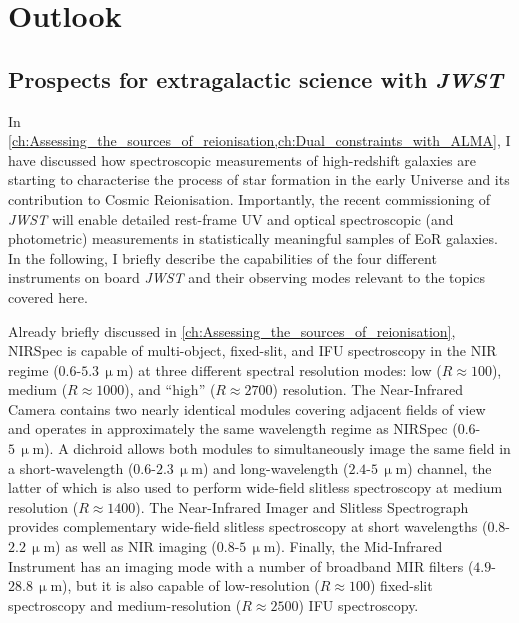 \section{Outlook}
\label{chCsec:Outlook}

\subsection{Prospects for extragalactic science with \textit{JWST}}
\label{chCssec:JWST}

In \cref{ch:Assessing_the_sources_of_reionisation,ch:Dual_constraints_with_ALMA}, I have discussed how spectroscopic measurements of high-redshift galaxies are starting to characterise the process of star formation in the early Universe and its contribution to Cosmic Reionisation. Importantly, the recent commissioning of \textit{JWST} \citep{2006SSRv..123..485G} will enable detailed rest-frame UV and optical spectroscopic (and photometric) measurements in statistically meaningful samples of EoR galaxies. In the following, I briefly describe the capabilities of the four different instruments on board \textit{JWST} and their observing modes relevant to the topics covered here.

Already briefly discussed in \cref{ch:Assessing_the_sources_of_reionisation}, NIRSpec \citep{2022A&A...661A..80J, 2022A&A...661A..81F} is capable of multi-object, fixed-slit, and IFU spectroscopy in the NIR regime ($0.6$-$5.3 \, \mathrm{\upmu m}$) at three different spectral resolution modes: low ($R \approx 100$), medium ($R \approx 1000$), and ``high'' ($R \approx 2700$) resolution. The Near-Infrared Camera \citep[NIRCam;][]{2005SPIE.5904....1R, 2012SPIE.8442E..2NB} contains two nearly identical modules covering adjacent fields of view and operates in approximately the same wavelength regime as NIRSpec ($0.6$-$5 \, \mathrm{\upmu m}$). A dichroid allows both modules to simultaneously image the same field in a short-wavelength ($0.6$-$2.3 \, \mathrm{\upmu m}$) and long-wavelength ($2.4$-$5 \, \mathrm{\upmu m}$) channel, the latter of which is also used to perform wide-field slitless spectroscopy at medium resolution ($R \approx 1400$). The Near-Infrared Imager and Slitless Spectrograph \citep[NIRISS;][]{2012SPIE.8442E..2RD} provides complementary wide-field slitless spectroscopy at short wavelengths ($0.8$-$2.2 \, \mathrm{\upmu m}$) as well as NIR imaging ($0.8$-$5 \, \mathrm{\upmu m}$). Finally, the Mid-Infrared Instrument \citep[MIRI;][]{2015PASP..127..584R} has an imaging mode with a number of broadband MIR filters ($4.9$-$28.8 \, \mathrm{\upmu m}$), but it is also capable of low-resolution ($R \approx 100$) fixed-slit spectroscopy and medium-resolution ($R \approx 2500$) IFU spectroscopy.

